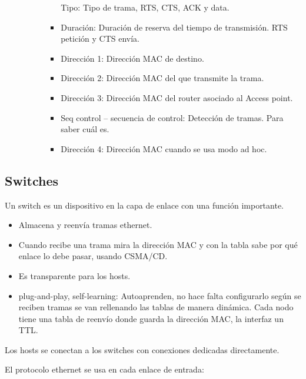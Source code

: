 \documentclass[12pt, twoside, openright]{report} %
\begin{document}
\begin{itemize}
\begin{itemize}
\begin{itemize}
\begin{itemize}
				                        Tipo: Tipo de trama, RTS, CTS, ACK y data.

				                  \item Duración: Duración de reserva del tiempo de transmisión. RTS petición y CTS envía.
				                  \item Dirección 1: Dirección MAC de destino.
				                  \item Dirección 2: Dirección MAC del que transmite la trama.
				                  \item Dirección 3: Dirección MAC del router asociado al Access point.
				                  \item Seq control – secuencia de control: Detección de tramas. Para saber cuál es.
				                  \item Dirección 4: Dirección MAC cuando se usa modo ad hoc.
			                  \end{itemize}

		            \end{itemize}



	      \end{itemize}
\end{itemize}

\subsection{Switches}

Un switch es un dispositivo en la capa de enlace con una función
importante.

\begin{itemize}
	\item Almacena y reenvía tramas ethernet.
	\item Cuando recibe una trama mira la dirección MAC y con la tabla
	      sabe por qué enlace lo debe pasar, usando CSMA/CD.
	\item Es transparente para los hosts.
	\item plug-and-play, self-learning: Autoaprenden, no hace falta
	      configurarlo según se reciben tramas se van rellenando las
	      tablas de manera dinámica. Cada nodo tiene una tabla de reenvío
	      donde guarda la dirección MAC, la interfaz un TTL.
\end{itemize}

Los hosts se conectan a los switches con conexiones dedicadas
directamente.

El protocolo ethernet se usa en cada enlace de entrada:
\end{document}
